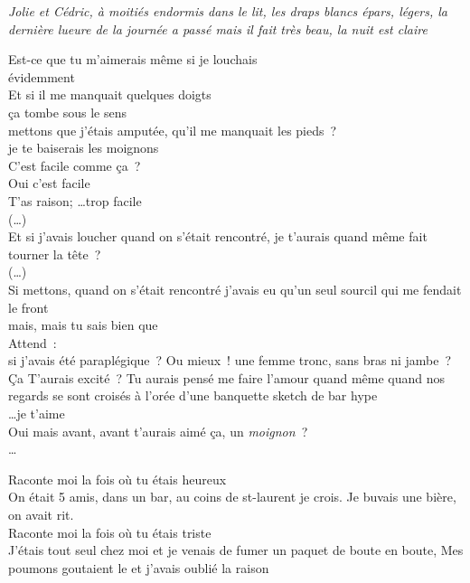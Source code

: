  \textit{Jolie et Cédric, à moitiés endormis dans le lit, les
draps blancs épars, légers, la dernière lueure de la journée a passé
mais il fait très beau, la nuit est claire}

Est-ce que tu m’aimerais même si je louchais\\
évidemment\\
Et si il me manquait quelques doigts\\
ça tombe sous le sens\\
mettons que j’étais amputée, qu’il me manquait les pieds ?\\
je te baiserais les moignons\\
C’est facile comme ça ?\\
Oui c’est facile\\
T’as raison; \ldots trop facile\\
(…)\\
Et si j’avais loucher quand on s’était rencontré, je t’aurais quand même fait tourner la tête ?\\
(…)\\
Si mettons, quand on s’était rencontré j'avais eu qu’un seul sourcil qui me
fendait le front\\
mais, mais tu sais bien que\\
Attend :\\
si j’avais été paraplégique ? Ou mieux ! une femme tronc, sans bras ni
jambe ? Ça T’aurais excité ? Tu aurais pensé me faire l’amour quand même quand
nos regards se sont croisés à l’orée d’une banquette sketch de bar hype\\

\ldots je t’aime\\
Oui mais avant, avant t’aurais aimé ça, un \textit{moignon} ? \\

\ldots

Raconte moi la fois où tu étais heureux\\
On était 5 amis, dans un bar, au coins de st-laurent je crois.
Je buvais une bière, on avait rit.\\
Raconte moi la fois où tu étais triste\\
J'étais tout seul chez moi et je venais de fumer
un paquet de boute en boute, Mes poumons goutaient le 
et j'avais oublié la raison

